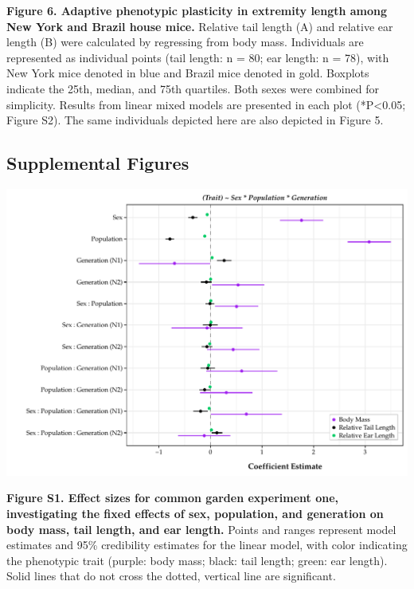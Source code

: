 \documentclass[]{article}
\begin{document}
\textbf{Figure 6. Adaptive phenotypic plasticity in extremity length
among New York and Brazil house mice.} Relative tail length (A) and
relative ear length (B) were calculated by regressing from body mass.
Individuals are represented as individual points (tail length: n = 80;
ear length: n = 78), with New York mice denoted in blue and Brazil mice
denoted in gold. Boxplots indicate the 25th, median, and 75th quartiles.
Both sexes were combined for simplicity. Results from linear mixed
models are presented in each plot (*P\textless{}0.05; Figure S2). The
same individuals depicted here are also depicted in Figure 5.

\newpage

\hypertarget{supplemental-figures}{%
\subsection{Supplemental Figures}\label{supplemental-figures}}

\includegraphics{../results/figures/GenerationsModel_relative.pdf}

\textbf{Figure S1. Effect sizes for common garden experiment one,
investigating the fixed effects of sex, population, and generation on
body mass, tail length, and ear length.} Points and ranges represent
model estimates and 95\% credibility estimates for the linear model,
with color indicating the phenotypic trait (purple: body mass; black:
tail length; green: ear length). Solid lines that do not cross the
dotted, vertical line are significant.

\newpage
\end{document}
